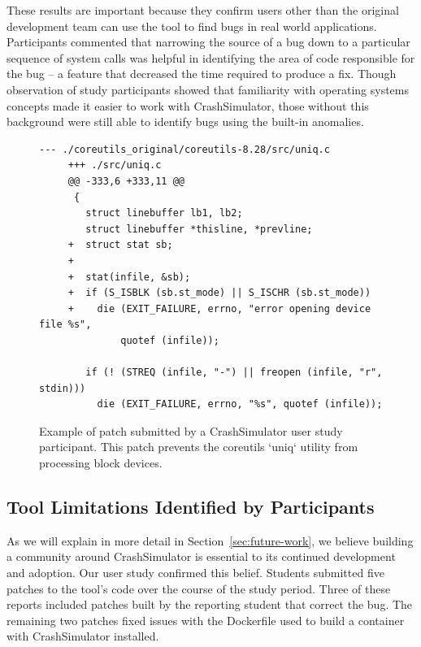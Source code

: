These results are important
because they confirm
users other than the original development team
can use the tool to find bugs in real world applications.
Participants commented that narrowing the source of a bug
down to a particular sequence of system calls
was helpful in identifying the area of
code responsible for the bug -- a feature
that decreased the time required to produce a fix.
Though observation of study participants
showed that familiarity with operating systems concepts
made it easier to work with CrashSimulator,
those without this background were still able to identify bugs using the
built-in anomalies.




 \begin{figure}
 \begin{lstlisting}[basicstyle=\ttfamily,gobble=4]
     --- ./coreutils_original/coreutils-8.28/src/uniq.c
     +++ ./src/uniq.c
     @@ -333,6 +333,11 @@
      {
        struct linebuffer lb1, lb2;
        struct linebuffer *thisline, *prevline;
     +  struct stat sb;
     +
     +  stat(infile, &sb);
     +  if (S_ISBLK (sb.st_mode) || S_ISCHR (sb.st_mode))
     +    die (EXIT_FAILURE, errno, "error opening device file %s",
              quotef (infile));

        if (! (STREQ (infile, "-") || freopen (infile, "r", stdin)))
          die (EXIT_FAILURE, errno, "%s", quotef (infile));
\end{lstlisting}
\caption[Participant Submitted Patch]{Example of patch submitted by a CrashSimulator user study participant.
This patch prevents the coreutils `uniq` utility from processing block devices. }
\label{fig:participantpatch}
\end{figure}

\subsection{Tool Limitations Identified by Participants}
\label{subsec:crashsim-patches}

As we will explain in more detail in Section~\ref{sec:future-work},
we believe building a community around CrashSimulator is essential to its
continued development and adoption.  Our user study confirmed this belief.
Students submitted five patches
to the tool's code over the
course of the study period.
Three of these reports included patches built by the reporting student that
correct the bug.
The remaining two patches fixed issues with the
Dockerfile used to build a container with CrashSimulator installed.

